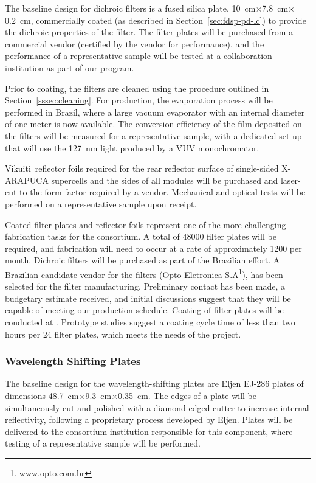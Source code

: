 The baseline design for dichroic filters is 
a fused silica plate,  \SI{10}{cm}$\times$\SI{7.8}{cm}$\times$\SI{0.2}{cm}, commercially coated (as described in Section~\ref{sec:fdsp-pd-lc}) to provide the dichroic properties of the filter.  
The filter plates will be purchased from a commercial vendor (certified by the vendor for performance), and the performance of a representative sample will be tested at a collaboration institution as part of our  program.  

Prior to coating, the filters are cleaned using the procedure outlined in Section~\ref{sssec:cleaning}.
For  production, the evaporation process will be performed
in Brazil, where a large vacuum evaporator with an internal diameter of one meter is now available. The conversion efficiency of the film deposited on the filters will be measured for a representative sample, with a dedicated set-up that will use the \SI{127}{nm} light produced by a VUV monochromator.

Vikuiti\texttrademark\ reflector foils required for the rear reflector surface of single-sided X-ARAPUCA supercells and the sides of all modules will be purchased and laser-cut to the form factor required by a vendor.  Mechanical and optical  tests will be performed on a representative sample upon receipt.

Coated filter plates and reflector foils represent one of the more challenging fabrication tasks for the consortium.  A total of \num{48000} filter plates will be required, and fabrication will need to occur at a rate of approximately \num{1200} per month.  Dichroic filters will be purchased as part of the Brazilian effort.  A Brazilian candidate vendor for the filters (Opto Eletronica S.A\footnote{www.opto.com.br}), has been selected for the filter manufacturing.  Preliminary contact has been made, a budgetary estimate received, and initial discussions suggest that they will be capable of meeting our production schedule.  Coating of filter plates will be conducted at .  Prototype studies suggest a coating cycle time of less than two hours per \num{24} filter plates, which meets the needs of the project.

\subsubsection{Wavelength Shifting Plates}

The baseline design for the wavelength-shifting plates are Eljen EJ-286 plates of dimensions \SI{48.7}{cm}$\times$\SI{9.3}{cm}$\times$\SI{0.35}{cm}.  The edges of a plate will be simultaneously cut and polished with a diamond-edged cutter to increase internal reflectivity, following a proprietary process developed by Eljen.  Plates will be delivered to the consortium institution responsible for this component, where  testing of a representative sample will be performed.

